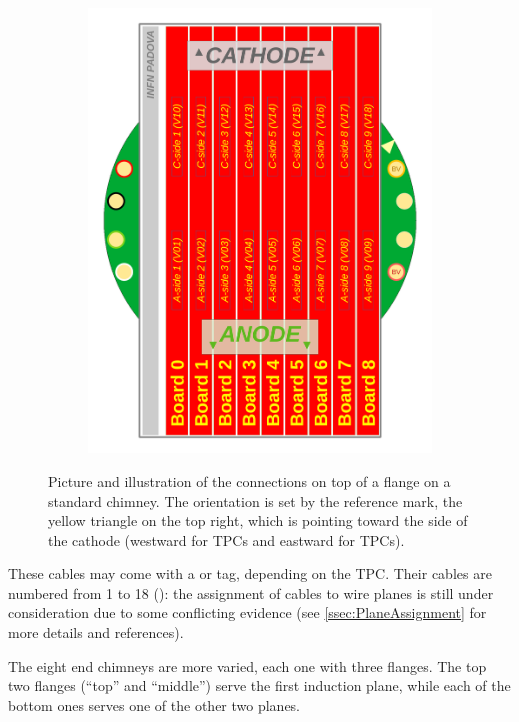 \begin{figure}
\begin{subfigure}{0.55\linewidth}
    \includegraphics[width=\textwidth]{figures/TopFlangesAndMinicrate}
  \end{subfigure}
  \caption{
    Picture and illustration of the connections on top of a flange on a standard chimney.
    The orientation is set by the reference mark,
    the yellow triangle on the top right,
    which is pointing toward the side of the cathode
    (\ie westward for  TPCs and eastward for  TPCs).
  }
  \label{fig:FlangeStandard}
\end{figure}

These cables may come with a  or  tag, depending on the TPC.
Their cables are numbered from 1 to 18 (\eg {}):
the assignment of cables to wire planes is still under consideration due to some conflicting evidence (see \ref{ssec:PlaneAssignment} for more details and references). 

The eight end chimneys are more varied, each one with three flanges.
The top two flanges (``top'' and ``middle'') serve the first induction plane,
while each of the bottom ones serves one of the other two planes.

